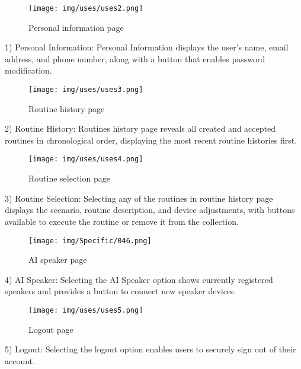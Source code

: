\documentclass[conference]{IEEEtran}
\begin{document}
\vspace{0.7em}

\begin{figure}[h]
    \centering
    \texttt{[image: img/uses/uses2.png]}
    \caption{Personal information page}
\end{figure}
1) Personal Information: Personal Information displays the user's name, email address, and phone number, along with a button that enables password modification.

\newpage

\begin{figure}[h]
    \centering
    \texttt{[image: img/uses/uses3.png]}
    \caption{Routine history page}
\end{figure}
2) Routine History: Routines history page reveals all created and accepted routines in chronological order, displaying the most recent routine histories first. 

\vspace{0.7em}

\begin{figure}[h]
    \centering
    \texttt{[image: img/uses/uses4.png]}
    \caption{Routine selection page}
\end{figure}
3) Routine Selection: Selecting any of the routines in routine history page displays the scenario, routine description, and device adjustments, with buttons available to execute the routine or remove it from the collection.

\newpage

\begin{figure}[h]
    \centering
    \texttt{[image: img/Specific/046.png]}
    \caption{AI speaker page}
\end{figure}
4) AI Speaker: Selecting the AI Speaker option shows currently registered speakers and provides a button to connect new speaker devices.

\vspace{0.7em}

\begin{figure}[h]
    \centering
    \texttt{[image: img/uses/uses5.png]}
    \caption{Logout page}
\end{figure}
5) Logout: Selecting the logout option enables users to securely sign out of their account.
\end{document}
